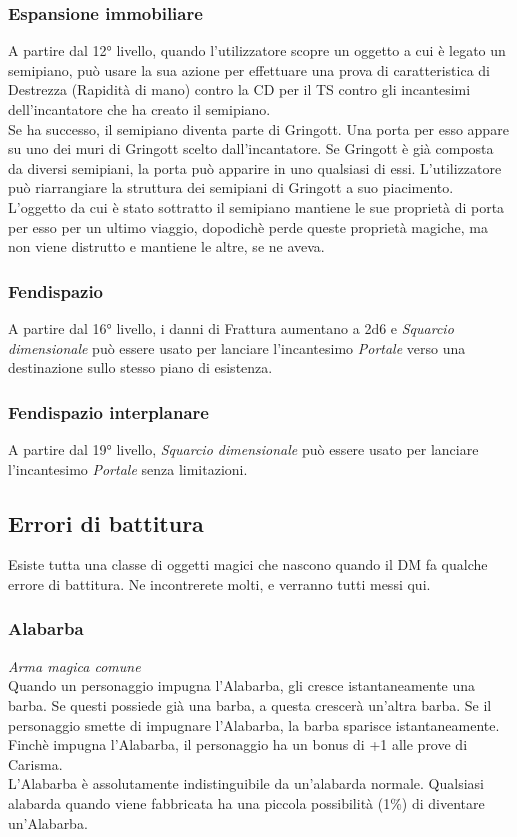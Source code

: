 \subsubsection{Espansione immobiliare}
A partire dal 12° livello, quando l'utilizzatore scopre un oggetto a cui è legato un semipiano, può usare la sua azione per effettuare una prova di caratteristica di Destrezza (Rapidità di mano) contro la CD per il TS contro gli incantesimi dell'incantatore che ha creato il semipiano.\\
Se ha successo, il semipiano diventa parte di Gringott. Una porta per esso appare su uno dei muri di Gringott scelto dall'incantatore. Se Gringott è già composta da diversi semipiani, la porta può apparire in uno qualsiasi di essi. L'utilizzatore può riarrangiare la struttura dei semipiani di Gringott a suo piacimento.\\
L'oggetto da cui è stato sottratto il semipiano mantiene le sue proprietà di porta per esso per un ultimo viaggio, dopodichè perde queste proprietà magiche, ma non viene distrutto e mantiene le altre, se ne aveva.

\subsubsection{Fendispazio}
A partire dal 16° livello, i danni di Frattura aumentano a 2d6 e \textit{Squarcio dimensionale} può essere usato per lanciare l'incantesimo \textit{Portale} verso una destinazione sullo stesso piano di esistenza.

\subsubsection{Fendispazio interplanare}
A partire dal 19° livello, \textit{Squarcio dimensionale} può essere usato per lanciare l'incantesimo \textit{Portale} senza limitazioni.

\subsection{Errori di battitura}
Esiste tutta una classe di oggetti magici che nascono quando il DM fa qualche errore di battitura. Ne incontrerete molti, e verranno tutti messi qui.

\subsubsection{Alabarba}
\textit{Arma magica comune}\\
Quando un personaggio impugna l'Alabarba, gli cresce istantaneamente una barba. Se questi possiede già una barba, a questa crescerà un'altra barba. Se il personaggio smette di impugnare l'Alabarba, la barba sparisce istantaneamente. Finchè impugna l'Alabarba, il personaggio ha un bonus di +1 alle prove di Carisma.\\
L'Alabarba è assolutamente indistinguibile da un'alabarda normale. Qualsiasi alabarda quando viene fabbricata ha una piccola possibilità (1\%) di diventare un'Alabarba.
